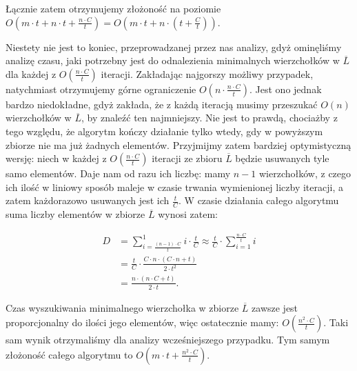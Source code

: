 Łącznie zatem otrzymujemy złożoność na poziomie $ O \left( m \cdot t + n \cdot t + \frac{n \cdot C}{t} \right) = O \left( m \cdot t + n \cdot \left( t + \frac{C}{t}\right) \right)$.

Niestety nie jest to koniec, przeprowadzanej przez nas analizy, gdyż ominęliśmy analizę czasu, jaki potrzebny jest do odnalezienia minimalnych wierzchołków w $\overline{L}$ dla każdej z $ O \left( \frac{n \cdot C}{t}\right)$ iteracji. Zakładając najgorszy możliwy przypadek, natychmiast otrzymujemy górne ograniczenie $O \left( n \cdot \frac{n \cdot C}{t} \right)$. Jest ono jednak bardzo niedokładne, gdyż zakłada, że z każdą iteracją musimy przeszukać $O \left( n \right)$ wierzchołków w $\overline{L}$, by znaleźć ten najmniejszy. Nie jest to prawdą, chociażby z tego względu, że algorytm kończy działanie tylko wtedy, gdy w powyższym zbiorze nie ma już żadnych elementów. Przyjmijmy zatem bardziej optymistyczną wersję: niech w każdej z $ O \left( \frac{n \cdot C}{t}\right)$ iteracji ze zbioru $\overline{L}$ będzie usuwanych tyle samo elementów. Daje nam od razu ich liczbę: mamy $n-1$ wierzchołków, z czego ich ilość w liniowy sposób maleje w czasie trwania wymienionej liczby iteracji, a zatem każdorazowo usuwanych jest ich $\frac{t}{C}$. W czasie działania całego algorytmu suma liczby elementów w zbiorze $\overline{L}$ wynosi zatem: 

\begin{equation}
	\begin{aligned}
		D &= \sum_{i=\frac{ \left( n-1 \right) \cdot C}{t}}^{1} i \cdot \frac{t}{C} \approx \frac{t}{C} \cdot \sum_{i=1}^{\frac{n \cdot C}{t}} i\\
		&= \frac{t}{C} \cdot \frac{C \cdot n \cdot \left( C \cdot n + t \right)}{2 \cdot t^{2}} \\
		&= \frac{n \cdot \left( n \cdot C + t \right)}{2 \cdot t}.
	\end{aligned}
\end{equation}

Czas wyszukiwania minimalnego wierzchołka w zbiorze $\overline{L}$ zawsze jest proporcjonalny do ilości jego elementów, więc ostatecznie mamy: $ O \left( \frac{n^{2} \cdot C}{t}\right)$. Taki sam wynik otrzymaliśmy dla analizy wcześniejszego przypadku. Tym samym złożoność całego algorytmu to $ O \left( m \cdot t + \frac{n^{2} \cdot C}{t}\right)$.

